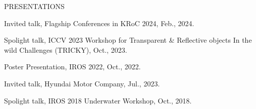 \begin{rSection}{PRESENTATIONS}{}{}{}        
    \begin{rSubsection}{}{}{}{}    
        \item Invited talk, Flagship Conferences in KRoC 2024, Feb., 2024.
        \item Spolight talk, ICCV 2023 Workshop for Transparent \& Reflective objects In the wild Challenges (TRICKY), Oct., 2023.
        \item Poster Presentation, IROS 2022, Oct., 2022.
        \item Invited talk, Hyundai Motor Company, Jul., 2023.
        \item Spolight talk, IROS 2018 Underwater Workshop, Oct., 2018.
     \end{rSubsection}         
 \end{rSection}

